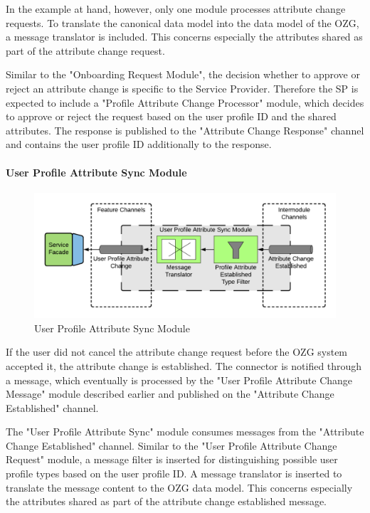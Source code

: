 In the example at hand, however, only one module processes attribute change requests. To translate the canonical data model into the data model of the OZG, a message translator is included. This concerns especially the attributes shared as part of the attribute change request.

Similar to the "Onboarding Request Module", the decision whether to approve or reject an attribute change is specific to the Service Provider. Therefore the SP is expected to include a "Profile Attribute Change Processor" module, which decides to approve or reject the request based on the user profile ID and the shared attributes. The response is published to the "Attribute Change Response" channel and contains the user profile ID additionally to the response.

\paragraph{User Profile Attribute Sync Module}

\begin{figure}[H]
    \centering
    \includegraphics[scale=0.6]{Diagrams/Integration Architecture 1/Technological Integration/13. User Profile Attribute Sync Module.pdf}
    \caption{User Profile Attribute Sync Module}
    \label{integration1:user_profile_attribute_sync_module}
\end{figure}

If the user did not cancel the attribute change request before the OZG system accepted it, the attribute change is established. The connector is notified through a message, which eventually is processed by the "User Profile Attribute Change Message" module described earlier and published on the "Attribute Change Established" channel.

The "User Profile Attribute Sync" module consumes messages from the "Attribute Change Established" channel. Similar to the "User Profile Attribute Change Request" module, a message filter is inserted for distinguishing possible user profile types based on the user profile ID. A message translator is inserted to translate the message content to the OZG data model. This concerns especially the attributes shared as part of the attribute change established message.

